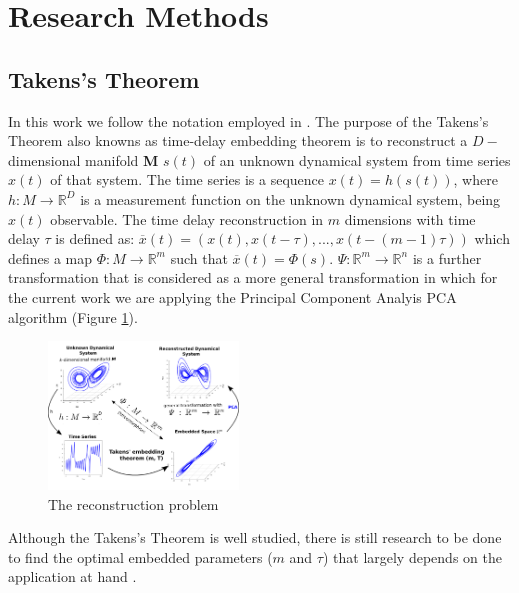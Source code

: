 \documentclass{sigchi}
\begin{document}
\section{Research Methods}
\subsection{Takens's Theorem}

In this work we follow the notation employed in \cite{Casdagli1991,Uzal2012}.
The purpose of the Takens's Theorem also knowns as time-delay embedding theorem 
is to reconstruct a $D-$dimensional manifold \textbf{M} $s(t)$ of an unknown dynamical 
system from time series $x(t)$ of that system. 
The time series is a sequence $x(t)=h(s(t))$, where $h: M \rightarrow \mathbb{R}^D$
is a measurement function on the unknown dynamical system, being $x(t)$ observable.
The time delay reconstruction in $m$ dimensions with time delay $\tau$ is defined as:
$\overline{x}(t) = (x(t), x(t-\tau),...,x(t-(m-1)\tau))$ which defines a map
$\varPhi: M \rightarrow \mathbb{R}^m$ such that $\overline{x}(t) = \varPhi(s)$.
$\varPsi: \mathbb{R}^m \rightarrow \mathbb{R}^n$ is a further transformation that
is considered as a more general transformation in which for the 
current work we are applying the Principal
Component Analyis PCA algorithm (Figure \ref{fig:takens_theorem}).

\begin{figure}[htbp!] 
\centering    
\includegraphics[width=0.45\textwidth]{takens_theorem_v3}
\caption[PA]{The reconstruction problem}
\label{fig:takens_theorem}
\end{figure}

Although the Takens's Theorem is well studied, there is still 
research to be done to find the optimal embedded parameters ($m$ and $\tau$) 
that largely depends on the application at hand \cite{J.FrankS.Mannor2010,Sama2013}.

\end{document}
